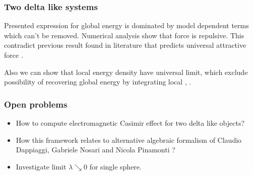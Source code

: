 \documentclass[10pt,t]{beamer}
\begin{document}
\begin{frame}
  \frametitle{Two delta like systems}


  Presented expression for global energy is dominated by model
  dependent terms which can't be removed. Numerical analysis show that
  force is repulsive. This contradict previous result found in
  literature that predicts universal attractive force
  \cite{ScardicchioCasimirDynamics2005}.

  Also we can show that local energy density have universal limit,
  which exclude possibility of recovering global energy by integrating
  local \cite{FermiPizzoccheroLocalCasimirPointImpurity2018},
  \cite{FermiCasimirEnergyAnomalyPointInteraction2020}.

\end{frame}





\begin{frame}
  \frametitle{Open problems}


  \begin{itemize}

  \item How to compute electromagnetic Casimir effect for two delta
    like objects?

  \item How this framework relates to alternative algebraic formalism
    of Claudio Dappiaggi, Gabriele Nosari and Nicola Pinamonti
    \cite{DappiaggiNosariPianamontiCasimirEffectAlgebraic2016}?

  \item Investigate limit $\lambda \searrow 0$ for single sphere.

  \end{itemize}

\end{frame}










\appendix





\end{document}

